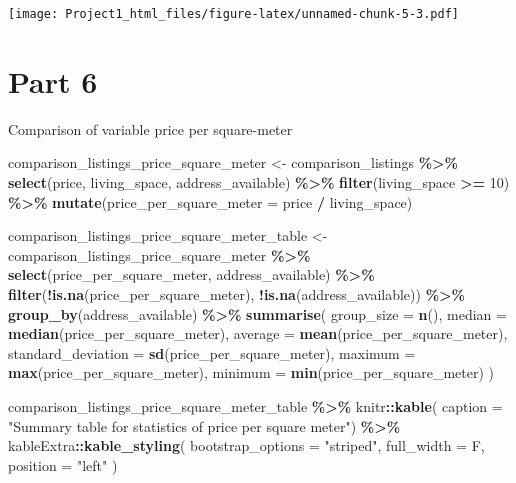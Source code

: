 \documentclass[
]{article}
\newenvironment{Shaded}{\begin{snugshade}}{\end{snugshade}}
\newcommand{\AttributeTok}[1]{\textcolor[rgb]{0.13,0.29,0.53}{#1}}
\newcommand{\DecValTok}[1]{\textcolor[rgb]{0.00,0.00,0.81}{#1}}
\newcommand{\FunctionTok}[1]{\textcolor[rgb]{0.13,0.29,0.53}{\textbf{#1}}}
\newcommand{\NormalTok}[1]{#1}
\newcommand{\OtherTok}[1]{\textcolor[rgb]{0.56,0.35,0.01}{#1}}
\newcommand{\SpecialCharTok}[1]{\textcolor[rgb]{0.81,0.36,0.00}{\textbf{#1}}}
\newcommand{\StringTok}[1]{\textcolor[rgb]{0.31,0.60,0.02}{#1}}
\begin{document}
\texttt{[image: Project1\_html\_files/figure-latex/unnamed-chunk-5-3.pdf]}

\hypertarget{part-6}{%
\section{Part 6}\label{part-6}}

Comparison of variable price per square-meter

\begin{Shaded}
\begin{Highlighting}[]
\NormalTok{comparison\_listings\_price\_square\_meter }\OtherTok{\textless{}{-}}\NormalTok{ comparison\_listings }\SpecialCharTok{\%\textgreater{}\%}
  \FunctionTok{select}\NormalTok{(price, living\_space, address\_available) }\SpecialCharTok{\%\textgreater{}\%}
  \FunctionTok{filter}\NormalTok{(living\_space }\SpecialCharTok{\textgreater{}=} \DecValTok{10}\NormalTok{) }\SpecialCharTok{\%\textgreater{}\%}
  \FunctionTok{mutate}\NormalTok{(}\AttributeTok{price\_per\_square\_meter =}
\NormalTok{           price }\SpecialCharTok{/}\NormalTok{ living\_space)}


\NormalTok{comparison\_listings\_price\_square\_meter\_table }\OtherTok{\textless{}{-}}
\NormalTok{  comparison\_listings\_price\_square\_meter }\SpecialCharTok{\%\textgreater{}\%}
  \FunctionTok{select}\NormalTok{(price\_per\_square\_meter, address\_available) }\SpecialCharTok{\%\textgreater{}\%}
  \FunctionTok{filter}\NormalTok{(}\SpecialCharTok{!}\FunctionTok{is.na}\NormalTok{(price\_per\_square\_meter), }\SpecialCharTok{!}\FunctionTok{is.na}\NormalTok{(address\_available)) }\SpecialCharTok{\%\textgreater{}\%}
  \FunctionTok{group\_by}\NormalTok{(address\_available) }\SpecialCharTok{\%\textgreater{}\%}
  \FunctionTok{summarise}\NormalTok{(}
    \AttributeTok{group\_size =} \FunctionTok{n}\NormalTok{(),}
    \AttributeTok{median =} \FunctionTok{median}\NormalTok{(price\_per\_square\_meter),}
    \AttributeTok{average =} \FunctionTok{mean}\NormalTok{(price\_per\_square\_meter),}
    \AttributeTok{standard\_deviation =} \FunctionTok{sd}\NormalTok{(price\_per\_square\_meter),}
    \AttributeTok{maximum =} \FunctionTok{max}\NormalTok{(price\_per\_square\_meter),}
    \AttributeTok{minimum =} \FunctionTok{min}\NormalTok{(price\_per\_square\_meter)}
\NormalTok{  )}

\NormalTok{comparison\_listings\_price\_square\_meter\_table }\SpecialCharTok{\%\textgreater{}\%}
\NormalTok{  knitr}\SpecialCharTok{::}\FunctionTok{kable}\NormalTok{(}
    \AttributeTok{caption =} \StringTok{"Summary table for statistics of price per square meter"}\NormalTok{) }\SpecialCharTok{\%\textgreater{}\%}
\NormalTok{  kableExtra}\SpecialCharTok{::}\FunctionTok{kable\_styling}\NormalTok{(}
    \AttributeTok{bootstrap\_options =} \StringTok{"striped"}\NormalTok{,}
    \AttributeTok{full\_width =}\NormalTok{ F,}
    \AttributeTok{position =} \StringTok{"left"}
\NormalTok{  )}
\end{Highlighting}
\end{Shaded}
\end{document}
